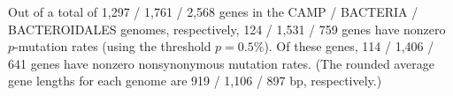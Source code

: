 Out of a total of 1,297 / 1,761 / 2,568 genes in the CAMP / BACTERIA / BACTEROIDALES genomes, respectively, 124 / 1,531 / 759 genes have nonzero $p$-mutation rates (using the threshold $p=0.5\%$). Of these genes, 114 / 1,406 / 641 genes have nonzero nonsynonymous mutation rates. (The rounded average gene lengths for each genome are 919 / 1,106 / 897 bp, respectively.)\endinput